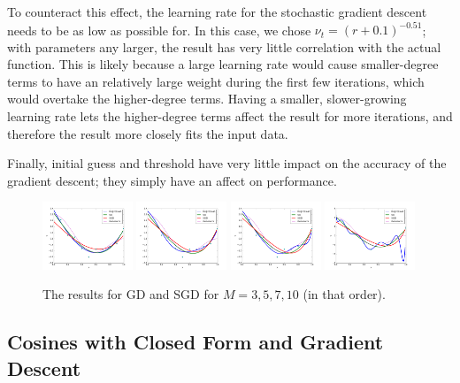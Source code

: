 \documentclass[10pt]{paper}
\begin{document}
To counteract this effect, the learning rate for the stochastic gradient descent needs to be as low as possible for. In this case, we chose $\nu_t = (r + 0.1)^{-0.51}$; with parameters any larger, the result has very little correlation with the actual function. This is likely because a large learning rate would cause smaller-degree terms to have an relatively large weight during the first few iterations, which would overtake the higher-degree terms. Having a smaller, slower-growing learning rate lets the higher-degree terms affect the result for more iterations, and therefore the result more closely fits the input data.

Finally, initial guess and threshold have very little impact on the accuracy of the gradient descent; they simply have an affect on performance.

\begin{figure}[ht!]
  \centering
  \label{fig:gd_m}
  \includegraphics[width=0.24\textwidth]{../images/all_m_3}
  \includegraphics[width=0.24\textwidth]{../images/all_m_5}
  \includegraphics[width=0.24\textwidth]{../images/all_m_7}
  \includegraphics[width=0.24\textwidth]{../images/all_m_10}
  \caption{The results for GD and SGD for $M = 3, 5, 7, 10$ (in that order).}
\end{figure}

\subsection{Cosines with Closed Form and Gradient Descent}
\end{document}
